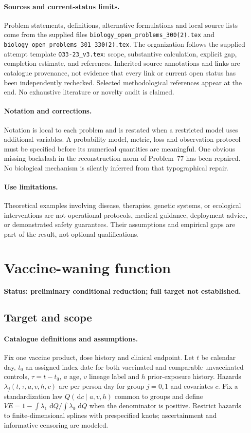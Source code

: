 \documentclass[11pt]{article}
\begin{document}
\paragraph{Sources and current-status limits.}
Problem statements, definitions, alternative formulations and local source lists
come from the supplied files
\texttt{biology\_open\_problems\_300(2).tex} and
\texttt{biology\_open\_problems\_301\_330(2).tex}.
The organization follows the supplied attempt template
\texttt{O33-23\_v3.tex}: scope, substantive calculation, explicit gap,
completion estimate, and references. Inherited source annotations and links are
catalogue provenance, not evidence that every link or current open status has
been independently rechecked. Selected methodological references appear at the
end. No exhaustive literature or novelty audit is claimed.

\paragraph{Notation and corrections.}
Notation is local to each problem and is restated when a restricted model uses
additional variables. A probability model, metric, loss and observation protocol
must be specified before its numerical quantities are meaningful. One obvious
missing backslash in the reconstruction norm of Problem~77 has been repaired.
No biological mechanism is silently inferred from that typographical repair.

\paragraph{Use limitations.}
Theoretical examples involving disease, therapies, genetic systems, or ecological
interventions are not operational protocols, medical guidance, deployment advice,
or demonstrated safety guarantees. Their assumptions and empirical gaps are part
of the result, not optional qualifications.


\section*{Vaccine-waning function}
\label{prob:207}
\noindent\textbf{Status: preliminary conditional reduction; full target not established.}
\subsection{Target and scope}
\paragraph{Catalogue definitions and assumptions.}
Fix one vaccine product, dose history and clinical endpoint. Let $t$ be calendar day, $t_0$ an assigned index date for both vaccinated and comparable unvaccinated controls, $\tau=t-t_0$, $a$ age, $v$ lineage label and $h$ prior-exposure history. Hazards $\lambda_j(t,\tau,a,v,h,c)$ are per person-day for group $j=0,1$ and covariates $c$. Fix a standardization law $Q(\,\mathrm{d} c\mid a,v,h)$ common to groups and define $VE=1-\int\lambda_1\,\,\mathrm{d} Q/\int\lambda_0\,\,\mathrm{d} Q$ when the denominator is positive. Restrict hazards to finite-dimensional splines with prespecified knots; ascertainment and informative censoring are modeled.
\end{document}
